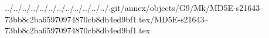 ../../../../../../../../../../../../.git/annex/objects/G9/Mk/MD5E-s21643--73bb8c2ba65970974870cb8db4ed9bf1.tex/MD5E-s21643--73bb8c2ba65970974870cb8db4ed9bf1.tex
